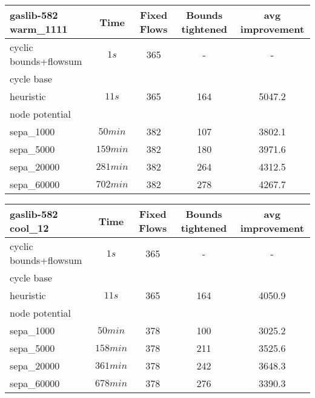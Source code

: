 \begin{center}
\begin{tabular}{ l | c | c | c | c }
\textbf{gaslib-582 warm\_1111} & Time  & Fixed Flows & Bounds tightened & avg improvement \\
\hline
 cyclic bounds+flowsum& $1s$ & 365 & - & -\\
 cycle base& $ $ &  &  &\\
 heuristic& $ 11s$& 365& 164 & 5047.2 \\
 node potential& $ $ &  &  &   \\ 
 sepa\_1000& $ 50 min$ & 382 & 107 & 3802.1 \\
 sepa\_5000& $ 159 min$ & 382 & 180 & 3971.6 \\
 sepa\_20000& $ 281 min$ & 382 & 264 & 4312.5 \\
 sepa\_60000& $702 min $ & 382& 278& 4267.7\\
\end{tabular} 
\end{center}

\begin{center}
\begin{tabular}{ l | c | c | c | c }

\textbf{gaslib-582 cool\_12} & Time  & Fixed Flows & Bounds tightened & avg improvement\\
\hline
 cyclic bounds+flowsum& $1s$ & 365 & - & - \\
 cycle base& $ $ &  &  & \\
 heuristic& $11s $& 365& 164 & 4050.9 \\
 node potential& $ $ &  &  &    \\ 
 sepa\_1000& $ 50 min $ & 378 & 100 & 3025.2\\
 sepa\_5000& $ 158 min$ & 378 & 211 & 3525.6\\ 
 sepa\_20000& $ 361 min$ & 378 & 242 & 3648.3  \\
 sepa\_60000& $678 min $ & 378& 276&3390.3 \\
\end{tabular} 
\end{center}

